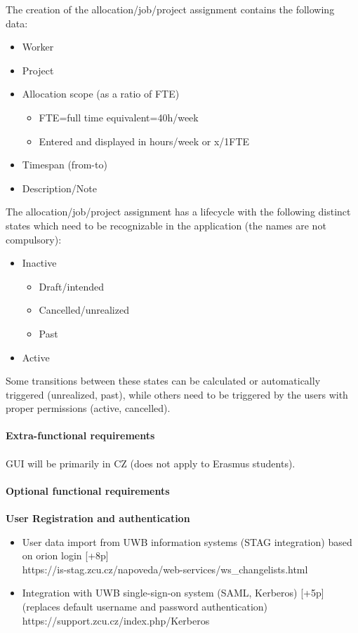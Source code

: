 \documentclass[czech,P5]{thesiskiv}
\begin{document}
The creation of the allocation/job/project assignment contains the following data: 
\begin{itemize}
             \item Worker
             \item Project
             \item Allocation scope (as a ratio of FTE) 
             \begin{itemize}
	             \item FTE=full time equivalent=40h/week 
	             \item Entered and displayed in hours/week or x/1FTE  
             \end{itemize}
             \item Timespan (from-to) 
             \item Description/Note 
\end{itemize}
The allocation/job/project assignment has a lifecycle with the following distinct states which need to be recognizable in the application (the names are not compulsory): 
\begin{itemize}
             \item Inactive
             \begin{itemize}
	             \item Draft/intended 
	             \item Cancelled/unrealized 
	              \item Past
             \end{itemize}
             \item Active
\end{itemize}
Some transitions between these states can be calculated or automatically triggered (unrealized, past), while others need to be triggered by the users with proper permissions (active, cancelled). 
\\\\
\textbf{Extra-functional requirements}
\\\\
GUI will be primarily in CZ (does not apply to Erasmus students). 
\\\\
{\LARGE \textbf{Optional functional requirements}}
\\\\
{\large \textbf{User Registration and authentication}}
\begin{itemize}
             \item User data import from UWB information systems (STAG integration) based on orion login [+8p] 
  		\\ https://is-stag.zcu.cz/napoveda/web-services/ws\_changelists.html 
             \item Integration with UWB single-sign-on system (SAML, Kerberos) [+5p] (replaces default username and password authentication) 
   		\\ https://support.zcu.cz/index.php/Kerberos 
\end{itemize}
\end{document}
